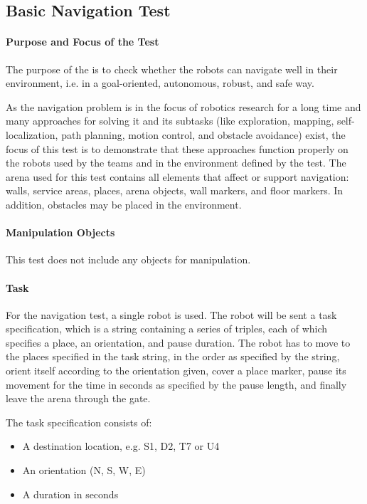 \newpage
\subsection{Basic Navigation Test}

\paragraph{Purpose and Focus of the Test}
The purpose of the  is to check whether the robots can navigate well in their environment, i.e. in a goal-oriented, autonomous, robust, and safe way.
\par
As the navigation problem is in the focus of robotics research for a long time and many approaches for solving it and its subtasks (like exploration, mapping, self-localization, path planning, motion control, and obstacle avoidance) exist, the focus of this test is to demonstrate that these approaches function properly on the robots used by the teams and in the environment defined by the test.
The arena used for this test contains all elements that affect or support navigation: walls, service areas, places, arena objects, wall markers, and floor markers. In addition, obstacles may be placed in the environment.
\par
\paragraph{Manipulation Objects}
This test does not include any objects for manipulation.
\paragraph{Task}
For the navigation test, a single robot is used. The robot will be sent a task specification, which is a string containing a series of triples, each of which specifies a place, an orientation, and pause duration. The robot has to move to the places specified in the task string, in the order as specified by the string, orient itself according to the orientation given, cover a place marker, pause its movement for the time in seconds as specified by the pause length, and finally leave the arena through the gate.

The task specification consists of:

\begin{itemize}
	\item A destination location, e.g. S1, D2, T7 or U4
	\item An orientation (N, S, W, E)
	\item A duration in seconds
\end{itemize}


